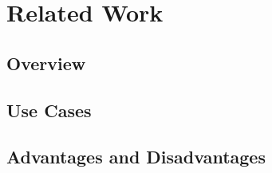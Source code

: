 \chapter{Related Work}
\section{Overview}
\section{Use Cases}
\section{Advantages and Disadvantages}
